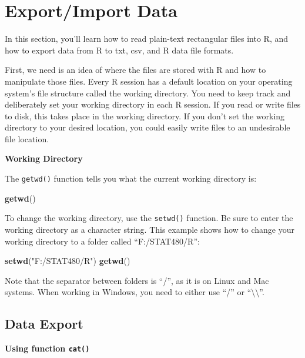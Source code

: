 \documentclass[]{book}
\newenvironment{Shaded}{\begin{snugshade}}{\end{snugshade}}
\newcommand{\KeywordTok}[1]{\textcolor[rgb]{0.13,0.29,0.53}{\textbf{#1}}}
\newcommand{\StringTok}[1]{\textcolor[rgb]{0.31,0.60,0.02}{#1}}
\newcommand{\NormalTok}[1]{#1}
\begin{document}
\section{Export/Import Data}\label{exportimport-data}

In this section, you'll learn how to read plain-text rectangular files
into R, and how to export data from R to txt, csv, and R data file
formats.

First, we need is an idea of where the files are stored with R and how
to manipulate those files. Every R session has a default location on
your operating system's file structure called the working directory. You
need to keep track and deliberately set your working directory in each R
session. If you read or write files to disk, this takes place in the
working directory. If you don't set the working directory to your
desired location, you could easily write files to an undesirable file
location.

\textbf{Working Directory}

The \texttt{getwd()} function tells you what the current working
directory is:

\begin{Shaded}
\begin{Highlighting}[]
\KeywordTok{getwd}\NormalTok{()}
\end{Highlighting}
\end{Shaded}

To change the working directory, use the \texttt{setwd()} function. Be
sure to enter the working directory as a character string. This example
shows how to change your working directory to a folder called
``F:/STAT480/R'':

\begin{Shaded}
\begin{Highlighting}[]
\KeywordTok{setwd}\NormalTok{(}\StringTok{"F:/STAT480/R"}\NormalTok{)}
\KeywordTok{getwd}\NormalTok{()}
\end{Highlighting}
\end{Shaded}

Note that the separator between folders is ``/'', as it is on Linux and
Mac systems. When working in Windows, you need to either use ``/'' or
``\textbackslash\textbackslash''.

\subsection{Data Export}\label{data-export}

\textbf{Using function \texttt{cat()}}
\end{document}
